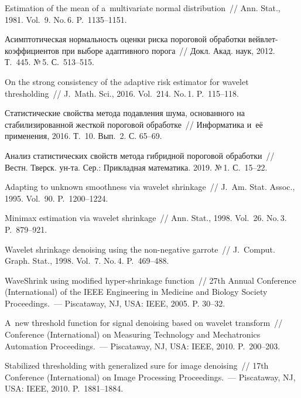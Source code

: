 \begin{multicols}{2}
{{\begin{thebibliography}{99}
 Estimation of the mean of a~multivariate normal distribution~//
 Ann. Stat., 1981. Vol.~9. No.\,6. P.~1135--1151.

  Асимптотическая нормальность оценки риска пороговой обработки вейв\-лет-ко\-эф\-фи\-ци\-ен\-тов 
при выборе адаптивного порога~// Докл.  Акад. наук, 2012. Т.~445. №\,5. С.~513--515.

 On the strong consistency of the adaptive risk estimator for wavelet thresholding~// 
J.~Math. Sci., 2016. Vol.~214. No.\,1. P.~115--118.


 Статистические свойства метода подавления шума, основанного на стабилизированной 
жесткой пороговой обработке~// Информатика и~её применения, 2016.  Т.~10. Вып.~2. С. 65--69.

 Анализ статистических свойств метода гибридной пороговой обработки~// 
 Вестн. Тверск. ун-та. Сер.: Прикладная математика. 2019. №\,1. С.~15--22.

 Adapting to unknown smoothness via wavelet shrinkage~// 
J.~Am. Stat. Assoc., 1995. Vol.~90. P.~1200--1224.

 Minimax estimation via wavelet shrinkage~// Ann. Stat., 
1998. Vol.~26. No.\,3. P.~879--921.

 Wavelet shrinkage denoising using the non-negative garrote~// J.~Comput. Graph. Stat., 
1998. Vol.~7. No.\,4. P.~469--488.

WaveShrink using modified hyper-shrinkage function~//
 27th Annual  Conference (International) of the IEEE Engineering in Medicine 
 and Biology Society Proceedings.~--- Piscataway, NJ, USA: IEEE, 2005. P. 30--32.

 A~new threshold function for signal denoising based on wavelet transform~// 
Conference (International) on Measuring Technology and Mechatronics Automation  Proceedings.~--- Piscataway, NJ, USA: 
IEEE, 2010. P.~200--203.

 Stabilized thresholding with generalized sure for image denoising~// 
17th Conference (International) on Image Processing Proceedings.~--- 
Piscataway, NJ, USA: IEEE, 2010. P.~1881--1884.


\end{thebibliography}}}
\end{multicols}
